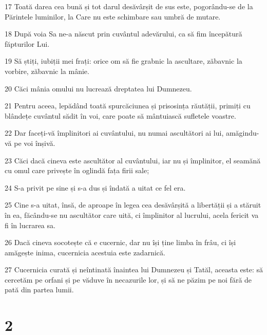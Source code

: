 \par 17 Toată darea cea bună și tot darul desăvârșit de sus este, pogorându-se de la Părintele luminilor, la Care nu este schimbare sau umbră de mutare.
\par 18 După voia Sa ne-a născut prin cuvântul adevărului, ca să fim începătură făpturilor Lui.
\par 19 Să știți, iubiții mei frați: orice om să fie grabnic la ascultare, zăbavnic la vorbire, zăbavnic la mânie.
\par 20 Căci mânia omului nu lucrează dreptatea lui Dumnezeu.
\par 21 Pentru aceea, lepădând toată spurcăciunea și prisosința răutății, primiți cu blândețe cuvântul sădit în voi, care poate să mântuiască sufletele voastre.
\par 22 Dar faceți-vă împlinitori ai cuvântului, nu numai ascultători ai lui, amăgindu-vă pe voi înșivă.
\par 23 Căci dacă cineva este ascultător al cuvântului, iar nu și împlinitor, el seamănă cu omul care privește în oglindă fața firii sale;
\par 24 S-a privit pe sine și s-a dus și îndată a uitat ce fel era.
\par 25 Cine s-a uitat, însă, de aproape în legea cea desăvârșită a libertății și a stăruit în ea, făcându-se nu ascultător care uită, ci împlinitor al lucrului, acela fericit va fi în lucrarea sa.
\par 26 Dacă cineva socotește că e cucernic, dar nu își ține limba în frâu, ci își amăgește inima, cucernicia acestuia este zadarnică.
\par 27 Cucernicia curată și neîntinată înaintea lui Dumnezeu și Tatăl, aceasta este: să cercetăm pe orfani și pe văduve în necazurile lor, și să ne păzim pe noi fără de pată din partea lumii.

\chapter{2}

